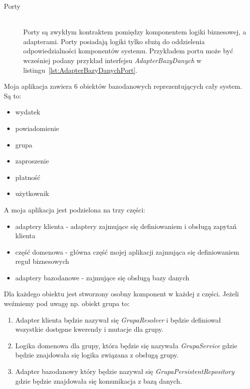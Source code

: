 \begin{description}
\item[Porty] \hfill \\ Porty są zwykłym kontraktem pomiędzy komponentem logiki biznesowej, a adapterami. Porty posiadają logiki tylko służą do oddzielenia odpowiedzialności komponentów systemu. Przykładem portu może być wcześniej podany przykład interfejsu \emph{AdapterBazyDanych} w listingu~\ref{lst:AdapterBazyDanychPort}. 

\end{description}
Moja aplikacja zawiera 6 obiektów bazodanowych reprezentujących cały system. Są to:
\begin{itemize}
  \item wydatek
  \item powiadomienie
  \item grupa
  \item zaproszenie
  \item płatność
  \item użytkownik
\end{itemize}
A moja aplikacja jest podzielona na trzy części:
\begin{itemize}
  \item adaptery klienta - adaptery zajmujące się definiowaniem i obsługą zapytań klienta
  \item część domenowa - główna część mojej aplikacji zajmująca się definiowaniem reguł biznesowych
  \item adaptery bazodanowe - zajmujące się obsługą bazy danych
\end{itemize}
Dla każdego obiektu jest stworzony osobny komponent w każdej z części. Jeżeli weźmiemy pod uwagę np. obiekt grupa to:
\begin{enumerate}
  \item Adapter klienta będzie nazywał się \emph{GrupaResolver} i będzie definiował wszystkie dostępne kwerendy i mutacje dla grupy.

  \item Logika domenowa dla grupy, która będzie się nazywała \emph{GrupaService} gdzie będzie znajdowała się logika związana z obsługą grupy.
  \item Adapter bazodanowy który będzie nazywał się \emph{GrupaPersistentRepository} gdzie będzie znajdowała się komunikacja z bazą danych.
    
\end{enumerate}

